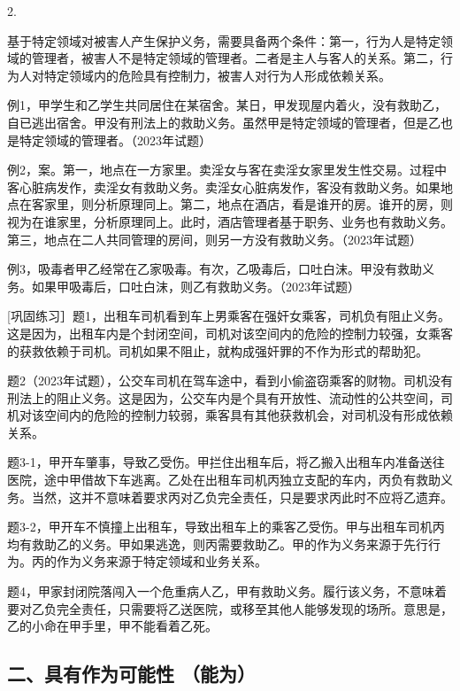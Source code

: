 2.

基于特定领域对被害人产生保护义务，需要具备两个条件：第一，行为人是特定领域的管理者，被害人不是特定领域的管理者。二者是主人与客人的关系。第二，行为人对特定领域内的危险具有控制力，被害人对行为人形成依赖关系。

例1，甲学生和乙学生共同居住在某宿舍。某日，甲发现屋内着火，没有救助乙，自已逃出宿舍。甲没有刑法上的救助义务。虽然甲是特定领域的管理者，但是乙也是特定领域的管理者。（2023年试题）

例2，案。第一，地点在一方家里。卖淫女与客在卖淫女家里发生性交易。过程中客心脏病发作，卖淫女有救助义务。卖淫女心脏病发作，客没有救助义务。如果地点在客家里，则分析原理同上。第二，地点在酒店，看是谁开的房。谁开的房，则视为在谁家里，分析原理同上。此时，酒店管理者基于职务、业务也有救助义务。第三，地点在二人共同管理的房间，则另一方没有救助义务。（2023年试题）

例3，吸毒者甲乙经常在乙家吸毒。有次，乙吸毒后，口吐白沫。甲没有救助义务。如果甲吸毒后，口吐白沫，则乙有救助义务。（2023年试题）

[巩固练习］题1，出租车司机看到车上男乘客在强奸女乘客，司机负有阻止义务。这是因为，出租车内是个封闭空间，司机对该空间内的危险的控制力较强，女乘客的获救依赖于司机。司机如果不阻止，就构成强奸罪的不作为形式的帮助犯。

题2（2023年试题），公交车司机在驾车途中，看到小偷盗窃乘客的财物。司机没有刑法上的阻止义务。这是因为，公交车内是个具有开放性、流动性的公共空间，司机对该空间内的危险的控制力较弱，乘客具有其他获救机会，对司机没有形成依赖关系。

题3-1，甲开车肇事，导致乙受伤。甲拦住出租车后，将乙搬入出租车内准备送往医院，途中甲借故下车逃离。乙处在出租车司机丙独立支配的车内，丙负有救助义务。当然，这并不意味着要求丙对乙负完全责任，只是要求丙此时不应将乙遗弃。

题3-2，甲开车不慎撞上出租车，导致出租车上的乘客乙受伤。甲与出租车司机丙均有救助乙的义务。甲如果逃逸，则丙需要救助乙。甲的作为义务来源于先行行为。丙的作为义务来源于特定领域和业务关系。

题4，甲家封闭院落闯入一个危重病人乙，甲有救助义务。履行该义务，不意味着要对乙负完全责任，只需要将乙送医院，或移至其他人能够发现的场所。意思是，乙的小命在甲手里，甲不能看着乙死。


\subsection*{二、具有作为可能性 （能为）}

